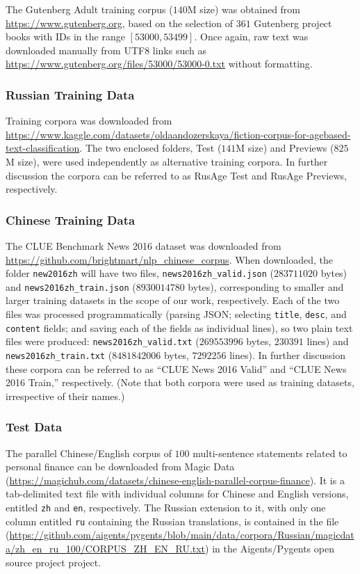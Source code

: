\documentclass[11pt]{article}
\begin{document}
The Gutenberg Adult training corpus ($140$M size) was obtained from \url{https://www.gutenberg.org}, based on the selection of $361$ Gutenberg project books with IDs in the range $[53000,53499]$. Once again, raw text was downloaded manually from UTF8 links such as \url{https://www.gutenberg.org/files/53000/53000-0.txt} without formatting.

\subsubsection{Russian Training Data}

Training corpora was downloaded from \url{https://www.kaggle.com/datasets/oldaandozerskaya/fiction-corpus-for-agebased-text-classification}. The two enclosed folders, Test ($141$M size) and Previews ($825$M size), were used independently as alternative training corpora. In further discussion the corpora can be referred to as RusAge Test and RusAge Previews, respectively.

\subsubsection{Chinese Training Data}

The CLUE Benchmark News 2016 dataset was downloaded from \url{https://github.com/brightmart/nlp_chinese_corpus}. When downloaded, the folder \texttt{new2016zh} will have two files, \texttt{news2016zh\_valid.json} ($283711020$ bytes) and \texttt{news2016zh\_train.json} ($8930014780$ bytes), corresponding to smaller and larger training datasets in the scope of our work, respectively. Each of the two files was processed programmatically (parsing JSON; selecting \texttt{title}, \texttt{desc}, and \texttt{content} fields; and saving each of the fields as individual lines), so two plain text files were produced: \texttt{news2016zh\_valid.txt} ($269553996$ bytes, $230391$ lines) and \texttt{news2016zh\_train.txt} ($8481842006$ bytes, $7292256$ lines). In further discussion these corpora can be referred to as “CLUE News 2016 Valid” and “CLUE News 2016 Train,” respectively. (Note that both corpora were used as training datasets, irrespective of their names.)

\subsubsection{Test Data}

The parallel Chinese/English corpus of $100$ multi-sentence statements related to personal finance can be downloaded from Magic Data (\url{https://magichub.com/datasets/chinese-english-parallel-corpus-finance}). It is a tab-delimited text file with individual columns for Chinese and English versions, entitled \texttt{zh} and \texttt{en}, respectively. The Russian extension to it, with only one column entitled \texttt{ru} containing the Russian translations, is contained in the file (\url{https://github.com/aigents/pygents/blob/main/data/corpora/Russian/magicdata/zh_en_ru_100/CORPUS_ZH_EN_RU.txt}) in the Aigents/Pygents open source project project.
\end{document}
